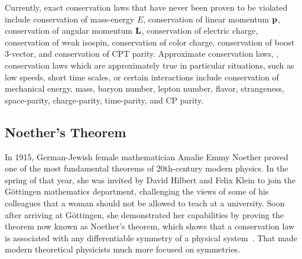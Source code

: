 Currently, exact conservation laws that have never been proven to be violated include conservation of mass-energy $E$, conservation of linear momentum $\vb{p}$, conservation of angular momentum $\vb{L}$, conservation of electric charge, conservation of weak isospin, conservation of color charge, conservation of boost 3-vector, and conservation of CPT parity. Approximate conservation laws, \ie, conservation laws which are approximately true in particular situations, such as low speeds, short time scales, or certain interactions include conservation of mechanical energy, mass, baryon number, lepton number, flavor, strangeness, space-parity, charge-parity, time-parity, and CP parity.

\subsection{Noether's Theorem}
\label{sec:noethers-theorem}

In 1915, German-Jewish female mathematician Amalie Emmy Noether proved one of the most fundamental theorems of 20th-century modern physics. In the spring of that year, she was invited by David Hilbert and Felix Klein to join the Göttingen mathematics department, challenging the views of some of his colleagues that a woman should not be allowed to teach at a university. Soon after arriving at Göttingen, she demonstrated her capabilities by proving the theorem now known as Noether's theorem, which shows that a conservation law is associated with any differentiable symmetry of a physical system~\cite{Lederman2004-fl}. That made modern theoretical physicists much more focused on symmetries.

